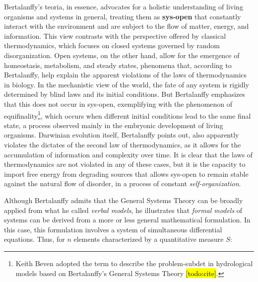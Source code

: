 \documentclass[./main_en.tex]{subfiles}
\begin{document}
\par Bertalanffy's \gls{teoria}, in essence, advocates for a holistic understanding of living organisms and systems in general, treating them as \textbf{\gls{sys-open}} that constantly interact with the environment and are subject to the flow of matter, energy, and information. This view contrasts with the perspective offered by classical thermodynamics, which focuses on closed systems governed by random disorganization. Open systems, on the other hand, allow for the emergence of homeostasis, metabolism, and steady states, phenomena that, according to Bertalanffy, help explain the apparent violations of the laws of thermodynamics in biology. In the mechanistic view of the world, the fate of any \gls{system} is rigidly determined by blind laws and its initial conditions. But Bertalanffy emphasizes that this does not occur in \gls{sys-open}, exemplifying with the phenomenon of equifinality\footnote{Keith Beven adopted the term  to describe the \gls{problem-subdet} in hydrological models based on Bertalanffy's General Systems Theory \hl{[todo:cite]}.}, which occurs when different initial conditions lead to the same final state, a process observed mainly in the embryonic development of living organisms. Darwinian evolution itself, Bertalanffy points out, also apparently violates the dictates of the second law of thermodynamics, as it allows for the accumulation of information and complexity over time. It is clear that the laws of thermodynamics are not violated in any of these cases, but it is the capacity to import free energy from degrading sources that allows \gls{sys-open} to remain stable against the natural flow of disorder, in a process of constant \textit{self-organization}.

\par Although Bertalanffy admits that the General Systems Theory can be broadly applied from what he called \textit{verbal models}, he illustrates that \textit{formal models} of systems can be derived from a more or less general mathematical formulation. In this case, this formulation involves a \gls{system} of simultaneous differential equations. Thus, for $n$ elements characterized by a quantitative measure $S$:
\end{document}
